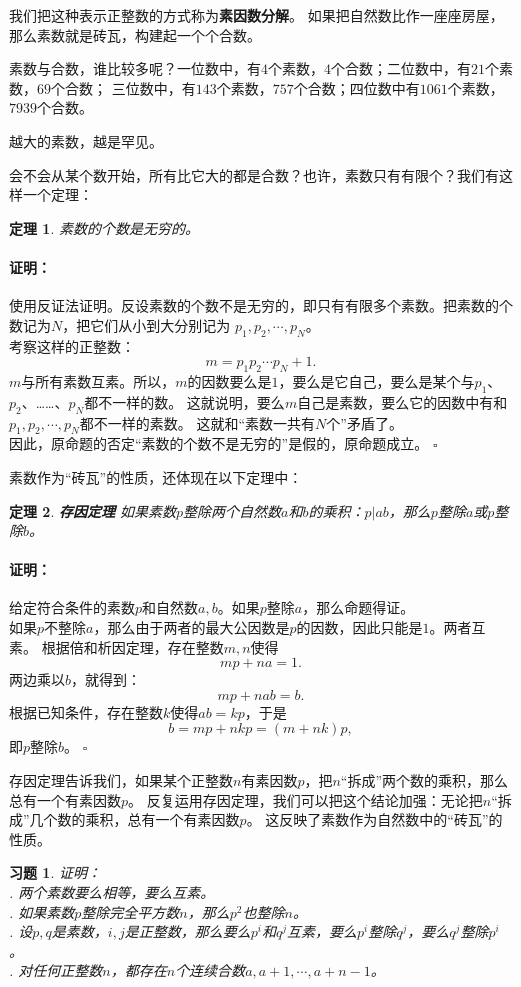 \documentclass[12pt,UTF8]{ctexbook}
\newtheorem{tm}{定理}[section]
\newenvironment{proof2}{\paragraph{\textbf{证明：}}}{\hfill$\square$}
\newtheorem{xt}{习题}[section]
\begin{document}
我们把这种表示正整数的方式称为\textbf{素因数分解}。
如果把自然数比作一座座房屋，那么素数就是砖瓦，构建起一个个合数。

素数与合数，谁比较多呢？一位数中，有$4$个素数，$4$个合数；二位数中，有$21$个素数，$69$个合数；
三位数中，有$143$个素数，$757$个合数；四位数中有$1061$个素数，$7939$个合数。

越大的素数，越是罕见。

会不会从某个数开始，所有比它大的都是合数？也许，素数只有有限个？我们有这样一个定理：

\begin{tm}\label{tm:1-0-10}
    素数的个数是无穷的。
\end{tm}
\begin{proof2}
    使用反证法证明。反设素数的个数不是无穷的，即只有有限多个素数。把素数的个数记为$N$，把它们从小到大分别记为
    $p_1, p_2,\cdots , p_N$。\\
    考察这样的正整数：
    $$ m = p_1p_2\cdots p_N + 1.$$
    $m$与所有素数互素。所以，$m$的因数要么是$1$，要么是它自己，要么是某个与$p_1$、$p_2$、……、$p_N$都不一样的数。
    这就说明，要么$m$自己是素数，要么它的因数中有和$p_1, p_2,\cdots , p_N$都不一样的素数。
    这就和“素数一共有$N$个”矛盾了。\\
    因此，原命题的否定“素数的个数不是无穷的”是假的，原命题成立。
\end{proof2}

素数作为“砖瓦”的性质，还体现在以下定理中：
\begin{tm}{\textbf{存因定理 }}\label{tm:1-0-20}
    如果素数$p$整除两个自然数$a$和$b$的乘积：$p | ab$，那么$p$整除$a$或$p$整除$b$。
\end{tm}
\begin{proof2}
    给定符合条件的素数$p$和自然数$a,b$。如果$p$整除$a$，那么命题得证。\\
    如果$p$不整除$a$，那么由于两者的最大公因数是$p$的因数，因此只能是$1$。两者互素。
    根据倍和析因定理，存在整数$m,n$使得
    $$ mp + na = 1.$$
    两边乘以$b$，就得到：
    $$ mp + nab = b. $$
    根据已知条件，存在整数$k$使得$ab = kp$，于是 
    $$ b = mp + nkp = (m + nk)p,$$
    即$p$整除$b$。
\end{proof2}

存因定理告诉我们，如果某个正整数$n$有素因数$p$，把$n$“拆成”两个数的乘积，那么总有一个有素因数$p$。
反复运用存因定理，我们可以把这个结论加强：无论把$n$“拆成”几个数的乘积，总有一个有素因数$p$。
这反映了素数作为自然数中的“砖瓦”的性质。

\begin{xt}\label{xt:1-0-0}
    证明：\\
    . 两个素数要么相等，要么互素。\\
    . 如果素数$p$整除完全平方数$n$，那么$p^2$也整除$n$。\\
    . 设$p,q$是素数，$i,j$是正整数，那么要么$p^i$和$q^j$互素，要么$p^i$整除$q^j$，要么$q^j$整除$p^i$。\\
    . 对任何正整数$n$，都存在$n$个连续合数$a, a+1, \cdots , a+n-1$。
\end{xt}
\end{document}
